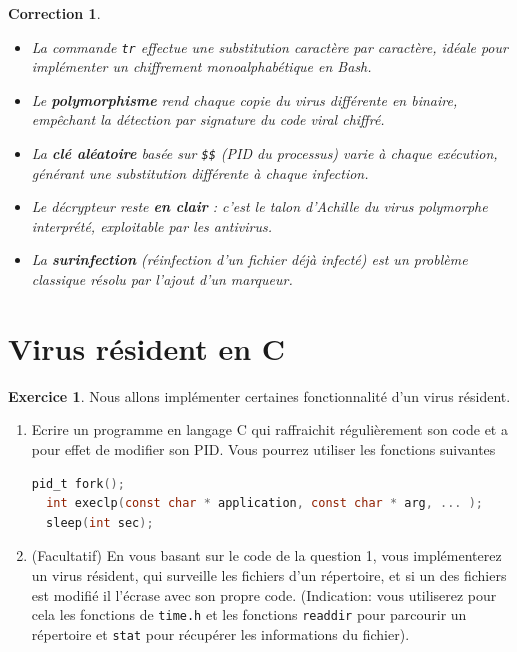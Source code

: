 \documentclass[a4paper,11pt]{article}
\theoremstyle{plain}
\newtheorem{correction}{Correction}
\theoremstyle{definition}
\newtheorem{exercice}{Exercice}
\begin{document}
\begin{correction}
\begin{pointcle}
\begin{itemize}
    \item La commande \texttt{tr} effectue une substitution caractère par caractère, idéale pour implémenter un chiffrement monoalphabétique en Bash.
    \item Le \textbf{polymorphisme} rend chaque copie du virus différente en binaire, empêchant la détection par signature du code viral chiffré.
    \item La \textbf{clé aléatoire} basée sur \texttt{\$\$} (PID du processus) varie à chaque exécution, générant une substitution différente à chaque infection.
    \item Le décrypteur reste \textbf{en clair} : c'est le talon d'Achille du virus polymorphe interprété, exploitable par les antivirus.
    \item La \textbf{surinfection} (réinfection d'un fichier déjà infecté) est un problème classique résolu par l'ajout d'un marqueur.
\end{itemize}
\end{pointcle}

\end{correction}


\section{Virus résident en C}


\begin{exercice} Nous allons implémenter certaines fonctionnalité d'un virus résident.
\begin{enumerate}
\item Ecrire un programme en langage C qui  raffraichit régulièrement son code et a pour effet de modifier son PID. Vous pourrez utiliser les fonctions suivantes
\begin{lstlisting}[language=C,numbers=none]
  pid_t fork();
  int execlp(const char * application, const char * arg, ... );
  sleep(int sec);
\end{lstlisting}
\item (Facultatif) En vous basant sur le code de la question 1, vous implémenterez un virus résident, qui surveille les fichiers d'un répertoire, et si un des fichiers est modifié il l'écrase avec son propre code. (Indication: vous utiliserez pour cela les fonctions de \texttt{time.h} et les fonctions \texttt{readdir} pour parcourir un répertoire et \texttt{stat} pour récupérer les informations du fichier).
\end{enumerate}
\end{exercice}
\end{document}
